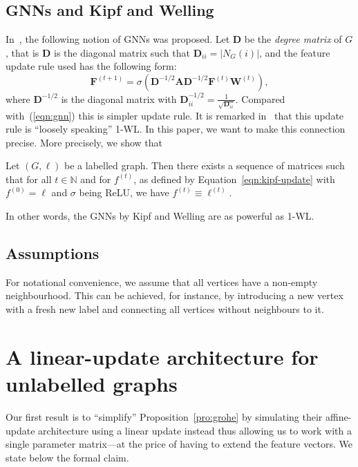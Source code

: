 \subsection{GNNs and Kipf and Welling}
In~\cite{kipf-loose}, the following notion of GNNs was proposed.
Let $\mathbf{D}$ be the \emph{degree matrix} of $G$, that is $\mathbf{D}$
is the diagonal matrix such that $
    \mathbf{D}_{ii} = |N_G(i)|$,
 and the feature update rule used has the following form:
\begin{equation}\label{eqn:kipf-update}
    \mathbf{F}^{(t+1)} = \sigma\left(
        \mathbf{D}^{-1/2}\mathbf{A}\mathbf{D}^{-1/2}
        \mathbf{F}^{(t)}\mathbf{W}^{(t)}
    \right),
\end{equation}
where $\mathbf{D}^{-1/2}$
is the diagonal matrix with
$\mathbf{D}^{-1/2}_{ii} =
\frac{1}{\sqrt{\mathbf{D}_{ii}}}$. Compared with~(\ref{eqn:gnn}) this
is simpler update rule. It is remarked in~\cite{kipf-loose} that this update
rule is ``loosely speaking'' 1-WL. In this paper, we want to make this connection 
precise. More precisely, we show that
\begin{theorem}\label{pro:grohe}
  Let $(G,\ell)$ be a labelled graph. Then there exists a sequence of matrices such that for all $t \in \mathbb{N}$ and
  for $f^{(t)}$, as defined by Equation~\eqref{eqn:kipf-update} with $f^{(0)} = \ell$
  and $\sigma$ being ReLU, we have $f^{(t)} \equiv \ell^{(t)}$.
\end{theorem}
In other words, the GNNs by Kipf and Welling are as powerful as 1-WL.

\subsection{Assumptions}
For notational convenience, we assume that all vertices have a non-empty
neighbourhood. This can be achieved, for instance, by introducing a new
vertex with a fresh new label and connecting all vertices without neighbours
to it.

\section{A linear-update architecture for unlabelled graphs}
Our first result is to ``simplify'' Proposition~\ref{pro:grohe} by simulating
their affine-update architecture using a linear update instead thus allowing
us to work with a single parameter matrix---at the price of having to extend
the feature vectors. We state below the formal claim.

